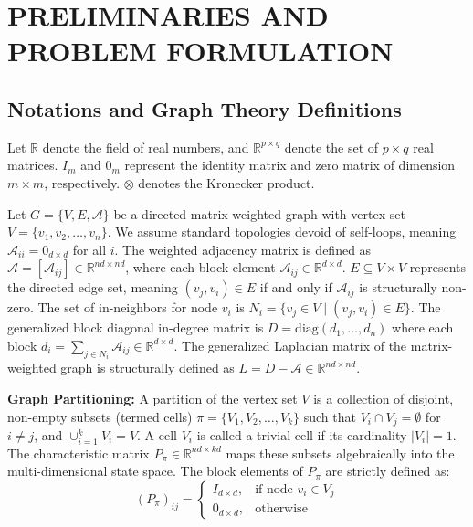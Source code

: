 \documentclass{IEEEtran}
\begin{document}
	\section{PRELIMINARIES AND PROBLEM FORMULATION}
	
	\subsection{Notations and Graph Theory Definitions}
	Let $\mathbb{R}$ denote the field of real numbers, and $\mathbb{R}^{p \times q}$ denote the set of $p \times q$ real matrices. $I_{m}$ and $0_{m}$ represent the identity matrix and zero matrix of dimension $m \times m$, respectively. $\otimes$ denotes the Kronecker product.
	
	Let $G=\{V,E,\mathcal{A}\}$ be a directed matrix-weighted graph with vertex set $V=\{v_{1},v_{2},\dots, v_{n}\}$. We assume standard topologies devoid of self-loops, meaning $\mathcal{A}_{ii} = 0_{d \times d}$ for all $i$. The weighted adjacency matrix is defined as $\mathcal{A}=[\mathcal{A}_{ij}]\in \mathbb{R}^{nd\times nd}$, where each block element $\mathcal{A}_{ij} \in \mathbb{R}^{d\times d}$. $E \subseteq V \times V$ represents the directed edge set, meaning $(v_j, v_i) \in E$ if and only if $\mathcal{A}_{ij}$ is structurally non-zero. The set of in-neighbors for node $v_{i}$ is $N_{i} = \{v_j \in V \mid (v_j, v_i) \in E\}$. The generalized block diagonal in-degree matrix is $D=\text{diag}(d_{1},\dots,d_{n})$ where each block $d_i = \sum_{j \in N_i} \mathcal{A}_{ij} \in \mathbb{R}^{d \times d}$. The generalized Laplacian matrix of the matrix-weighted graph is structurally defined as $L = D - \mathcal{A} \in \mathbb{R}^{nd \times nd}$.
	
	\textbf{Graph Partitioning:} A partition of the vertex set $V$ is a collection of disjoint, non-empty subsets (termed cells) $\pi=\{V_{1},V_{2},\dots,V_{k}\}$ such that $V_i \cap V_j = \emptyset$ for $i \neq j$, and $\cup_{i=1}^k V_{i}=V$. A cell $V_i$ is called a trivial cell if its cardinality $|V_i|=1$. The characteristic matrix $P_{\pi} \in \mathbb{R}^{nd \times kd}$ maps these subsets algebraically into the multi-dimensional state space. The block elements of $P_{\pi}$ are strictly defined as:
	\begin{equation}
		(P_{\pi})_{ij} = \begin{cases} I_{d \times d}, & \text{if node } v_i \in V_j \\ 0_{d \times d}, & \text{otherwise} \end{cases} \label{eq:P_pi}
	\end{equation}
	
\end{document}

